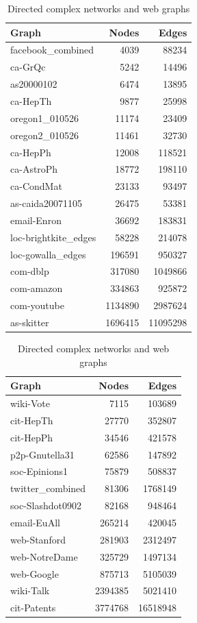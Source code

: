 \begin{table}[h!]
\parbox{.45\linewidth}{
\centering
\begin{tabular}{lrr}

\hline
 Graph                &   Nodes &    Edges \\
\hline
 facebook\_combined    &    4039 &    88234 \\
 ca-GrQc              &    5242 &    14496 \\
 as20000102           &    6474 &    13895 \\
 ca-HepTh             &    9877 &    25998 \\
 oregon1\_010526       &   11174 &    23409 \\
 oregon2\_010526       &   11461 &    32730 \\
 ca-HepPh             &   12008 &   118521 \\
 ca-AstroPh           &   18772 &   198110 \\
 ca-CondMat           &   23133 &    93497 \\
 as-caida20071105     &   26475 &    53381 \\
 email-Enron          &   36692 &   183831 \\
 loc-brightkite\_edges &   58228 &   214078 \\
 loc-gowalla\_edges    &  196591 &   950327 \\
 com-dblp      &  317080 &  1049866 \\
 com-amazon    &  334863 &   925872 \\
 com-youtube   & 1134890 &  2987624 \\
 as-skitter           & 1696415 & 11095298 \\
\hline
\end{tabular}
\caption{Undirected complex networks}

}
\hfill
\parbox{.45\linewidth}{
\centering
\begin{tabular}{lrr}
\hline
 Graph            &   Nodes &   Edges \\
\hline
 wiki-Vote        &    7115 &   103689 \\
 cit-HepTh        &   27770 &   352807 \\
 cit-HepPh        &   34546 &   421578 \\
 p2p-Gnutella31   &   62586 &   147892 \\
 soc-Epinions1    &   75879 &   508837 \\
 twitter\_combined &   81306 &  1768149 \\
 soc-Slashdot0902 &   82168 &   948464 \\
 email-EuAll      &  265214 &   420045 \\
 web-Stanford     &  281903 &  2312497 \\
 web-NotreDame    &  325729 &  1497134 \\
 web-Google       &  875713 &  5105039 \\
 wiki-Talk        & 2394385 &  5021410 \\
 cit-Patents      & 3774768 & 16518948 \\
\hline
\end{tabular}

\caption{Directed complex networks and web graphs}
}
\end{table}

